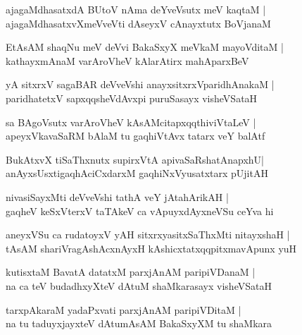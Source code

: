 \begin{shloka}
ajagaMdhasatxdA BUtoV nAma deYveVsutx meV kaqtaM |\\
ajagaMdhasatxvXmeVveVti dAseyxV cAnayxtutx BoVjanaM
\end{shloka}

\begin{shloka}
EtAsAM shaqNu meV deVvi BakaSxyX meVkaM mayoVditaM |\\
kathayxmAnaM varAroVheV kAlarAtirx mahAparxBeV 
\end{shloka}

\begin{shloka}
yA sitxrxV sagaBAR deVveVshi anayxsitxrxVparidhAnakaM |\\
paridhatetxV sapxqqsheVdAvxpi puruSasayx visheVSataH
\end{shloka}

\begin{shloka}
sa BAgoVsutx varAroVheV kAsAMcitapxqqthiviVtaLeV |\\
apeyxVkavaSaRM bAlaM tu gaqhiVtAvx tatarx veY balAtf
\end{shloka}

\begin{shloka}
BukAtxvX tiSaThxnutx supirxVtA apivaSaRshatAnapxhU\R |\\
anAyxsUsxtigaqhAciCxdarxM gaqhiNxVyusatxtarx pUjitAH
\end{shloka}

\begin{shloka}
nivasiSayxMti deVveVshi tathA veY jAtahArikAH |\\
gaqheV keSxVterxV taTAkeV ca vApuyxdAyxneVSu ceYva hi
\end{shloka}

\begin{shloka}
aneyxVSu ca rudatoyxV yAH sitxrxyasitxSaThxMti nitayxshaH |\\
tAsAM shariVragAshAcxnAyxH kAshicxtatxqqpitxmavApunx yuH
\end{shloka}

\begin{shloka}
kutisxtaM BavatA datatxM parxjAnAM paripiVDanaM |\\
na ca teV budadhxyXteV dAtuM shaMkarasayx visheVSataH
\end{shloka}

\begin{shloka}
tarxpAkaraM yadaPxvati parxjAnAM paripiVDitaM |\\
na tu taduyxjayxteV dAtumAsAM BakaSxyXM tu shaMkara
\end{shloka}

